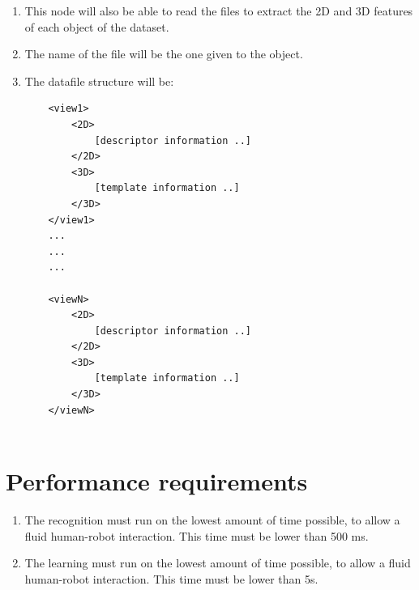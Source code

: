 \documentclass{article}
\makeatletter
\def\threedigits#1{\expandafter\@threedigits\csname c@#1\endcsname}
\def\@threedigits#1{%
  \ifnum#1<100 0\fi
  \ifnum#1<10 0\fi
  \number#1}
\makeatother
\begin{document}
\begin{enumerate}[label=\textbf{FR\threedigits*}, leftmargin=2cm]
\item This node will also be able to read the files to extract the 2D and 3D features of each object of the dataset. 

\item The name of the file will be the one given to the object. 

\item The datafile structure will be: \\
		\begin{lstlisting}
	<view1>
		<2D>
			[descriptor information ..]
		</2D>
		<3D>
			[template information ..]
		</3D>
	</view1>	
	...
	...
	...		
			
	<viewN>
		<2D>
			[descriptor information ..]
		</2D>
		<3D>
			[template information ..]
		</3D>
	</viewN>	
		
		\end{lstlisting}
	


\end{enumerate}





\section{Performance requirements}

\begin{enumerate}[label=\textbf{PR\threedigits*}]
\item The recognition must run on the lowest amount of time possible, to allow a fluid human-robot interaction. This time must be lower than 500 ms. 
\item The learning must run on the lowest amount of time possible, to allow a fluid human-robot interaction. This time must be lower than 5s. 
\end{enumerate}


\end{document}
